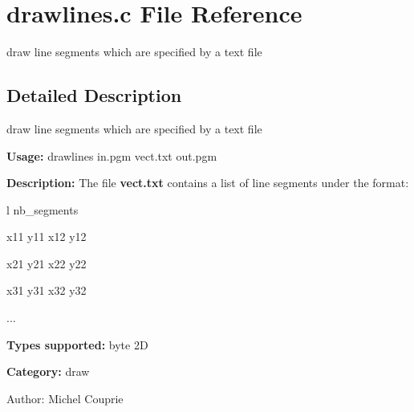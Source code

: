 \section{drawlines.c File Reference}
\label{drawlines_8c}
draw line segments which are specified by a text file  




\label{_details}
\subsection{Detailed Description}
draw line segments which are specified by a text file 

{\bf Usage:} drawlines in.pgm vect.txt out.pgm

{\bf Description:} The file {\bf vect.txt} contains a list of line segments under the format:\par
 l nb\_\-segments\par
 x11 y11 x12 y12\par
 x21 y21 x22 y22\par
 x31 y31 x32 y32\par
 ...\par


{\bf Types supported:} byte 2D

{\bf Category:} draw

\begin{Desc}
\item[Author:]Michel Couprie \end{Desc}
